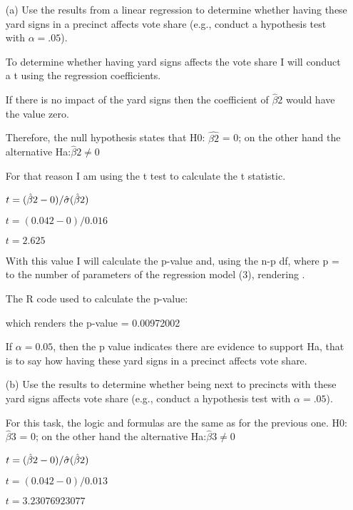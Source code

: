 \documentclass[12pt,letterpaper]{article}
\begin{document}
\vspace{.5cm}
\begin{enumerate}
	\item [(a)] Use the results from a linear regression to determine whether having these yard signs in a precinct affects vote share (e.g., conduct a hypothesis test with $\alpha = .05$).
	
	To determine whether having yard signs affects the vote share I will conduct a t using the regression coefficients. 
	
	If there is no impact of the yard signs then the coefficient of $\hat{\beta}2$ would have the value zero. 
	
	Therefore, the null hypothesis states that H0: $\hat{\beta2}$ = 0; on the other hand the alternative Ha:$\hat{\beta}2 \neq 0$
	
	For that reason I am using the t test to calculate the t statistic. 
	
	$t = (\hat{\beta}2 - 0)/\hat\sigma\tiny(\hat{\beta}2) $
	
	$t = (0.042-0)/0.016$
	
	$t = 2.625$
	
	With this value I will calculate the p-value and, using the n-p df, where p = to the number of parameters of the regression model (3), rendering .
	
	The R code used to calculate the p-value:  
	
	  
	
	which renders the p-value = 0.00972002
	
	If $\alpha = 0.05$, then the p value indicates there are evidence to support Ha, that is to say how having these yard signs in a precinct affects vote share.  
	
	\vspace{2cm}
			
	\item [(b)]  Use the results to determine whether being
	next to precincts with these yard signs affects vote
	share (e.g., conduct a hypothesis test with $\alpha = .05$).
	
	For this task, the logic and formulas are the same as for the previous one. H0: $\hat{\beta}3$ = 0; on the other hand the alternative Ha:$\hat{\beta}3 \neq 0$  
	
	$t = (\hat{\beta}2 - 0)/\hat\sigma\tiny(\hat{\beta}2) $
	
	$t = (0.042-0)/0.013$
	
	$t = 3.23076923077$
	

\end{enumerate}
\end{document}
